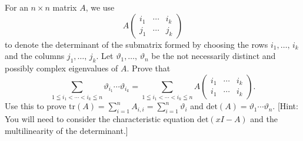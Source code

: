 \documentclass[a4paper,11pt]{article}
\newcommand{\blue}[1]{\textcolor{blue}{#1}}
\begin{document}
 For an $n \times n$ matrix $A$, we use
\[
  A\begin{pmatrix}i_1 & \cdots & i_k \\ j_1 & \cdots & j_k\end{pmatrix}
\]
to denote the determinant of the submatrix formed by choosing the rows
$i_1,\dots,\,i_k$ and the columns $j_1,\dots,\,j_k$. Let
$\vartheta_1,\dots,\,\vartheta_n$ be the not necessarily distinct and possibly
complex eigenvalues of $A$. Prove that
\[
  \sum_{1 \leqq i_1 < \cdots < i_k \leqq n} \vartheta_{i_1}\cdots\vartheta_{i_k}
  = \sum_{1 \leqq i_1 < \cdots < i_k \leqq n} A
  \begin{pmatrix}
    i_1 & \cdots & i_k \\ i_1 & \cdots & i_k
  \end{pmatrix}.
\]
Use this to prove $\text{tr}(A)=\sum_{i=1}^n A_{i,i} = \sum_{i=1}^n \vartheta_i$
and $\text{det}(A)=\vartheta_1 \cdots \vartheta_n$. [Hint: You will need to
consider the characteristic equation $\text{det}(xI-A)$ and the multilinearity
of the determinant.] \\

        
\end{document}

